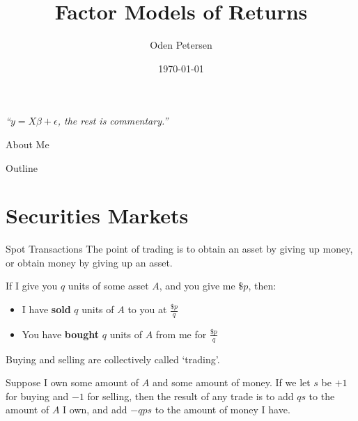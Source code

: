 \documentclass{beamer}
\title[Short Title]{Factor Models of Returns}
\author[Your Name]{Oden Petersen}
\date{\today}
\begin{document}
\begin{frame}
	\titlepage
	\begin{center}
		\textit{``$y=X\beta+\epsilon$, the rest is commentary.''}
	\end{center}
\end{frame}

\begin{frame}{About Me}
\end{frame}

\begin{frame}{Outline}
	\tableofcontents
\end{frame}

\section{Securities Markets}

\begin{frame}{Spot Transactions}
	The point of trading is to obtain an asset by giving up money, or obtain money by giving up an asset.

	If I give you $q$ units of some asset $A$, and you give me $\$p$, then:
	\begin{itemize}
		\item I have \textbf{sold} $q$ units of $A$ to you at $\frac{\$p}{q}$
		\item You have \textbf{bought} $q$ units of $A$ from me for $\frac{\$p}{q}$
	\end{itemize} %

	Buying and selling are collectively called `trading'.

	Suppose I own some amount of $A$ and some amount of money. If we let $s$ be $+1$ for buying and $-1$ for selling, then the result of any trade is to add $qs$ to the amount of $A$ I own, and add $-qps$ to the amount of money I have. %

\end{frame}
\end{document}
